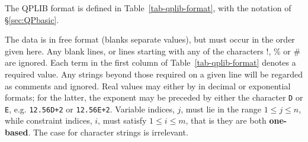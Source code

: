 
The QPLIB format is defined in Table~\ref{tab-qplib-format}, with the notation of \S\ref{sec:QPbasic}.

The data is in free format (blanks separate values), but must occur in
the order given here. Any blank lines, or lines starting with any of the
characters !, \% or \# are ignored. Each term in the first column of
Table~\ref{tab-qplib-format} denotes a required value. Any strings beyond
those required on a given line will be regarded as comments and ignored.
Real values may either by in decimal or exponential formats; for the latter,
the exponent may be preceded by either the character \texttt{D} or \texttt{E},
e.g. \texttt{12.56D+2} or \texttt{12.56E+2}. Variable indices, $j$, must lie in
the range $1 \leq j \leq n$, while constraint indices, $i$, must satisfy
$1 \leq i \leq m$, that is they are both \textbf{one-based}. The case for
character strings is irrelevant.


